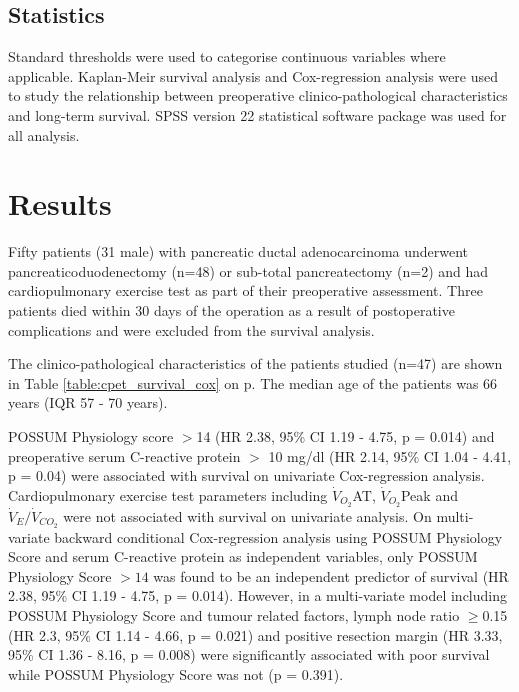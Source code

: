 \subsection{Statistics}
Standard thresholds were used to categorise continuous variables where applicable. Kaplan-Meir survival analysis and Cox-regression analysis were used to study the relationship between preoperative clinico-pathological characteristics and long-term survival. SPSS version 22 statistical software package was used for all analysis.

\clearpage

\section{Results}




Fifty patients (31 male) with pancreatic ductal adenocarcinoma underwent pancreaticoduodenectomy (n=48) or sub-total pancreatectomy (n=2) and had cardiopulmonary exercise test as part of their preoperative assessment. Three patients died within 30 days of the operation as a result of postoperative complications and were excluded from the survival analysis.

The clinico-pathological characteristics of the patients studied (n=47) are shown in Table \ref{table:cpet_survival_cox} on p\pageref{table:cpet_survival_cox}.   The median age of the patients was 66 years (IQR 57 - 70 years).

POSSUM Physiology score $>$14 (HR 2.38, 95\% CI 1.19 - 4.75, p = 0.014) and preoperative serum C-reactive protein $>$ 10 mg/dl (HR 2.14, 95\% CI 1.04 - 4.41, p = 0.04) were associated with survival on univariate Cox-regression analysis. Cardiopulmonary exercise test parameters including $\dot{V}_{O_2}$AT, $\dot{V}_{O_2}$Peak and $\dot{V}_E/\dot{V}_{CO_2}$ were not associated with survival on univariate analysis.
On multi-variate backward conditional Cox-regression analysis using POSSUM Physiology Score and serum C-reactive protein as independent variables, only POSSUM Physiology Score $>14$  was found to be an independent predictor of survival (HR 2.38, 95\% CI 1.19 - 4.75, p = 0.014). However, in a multi-variate model including POSSUM Physiology Score and tumour related factors, lymph node ratio $\geq$0.15 (HR 2.3, 95\% CI 1.14 - 4.66, p = 0.021) and positive resection margin (HR 3.33, 95\% CI 1.36 - 8.16, p = 0.008) were significantly associated with poor survival while POSSUM Physiology Score was not (p = 0.391).


